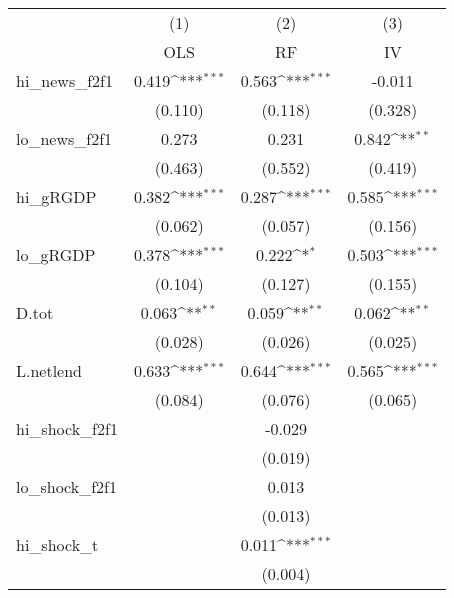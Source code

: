 {
\def\sym#1{\ifmmode^{#1}\else\(^{#1}\)\fi}
\begin{tabular}{l*{3}{c}}
\toprule
            &\multicolumn{1}{c}{(1)}&\multicolumn{1}{c}{(2)}&\multicolumn{1}{c}{(3)}\\
            &\multicolumn{1}{c}{OLS}&\multicolumn{1}{c}{RF}&\multicolumn{1}{c}{IV}\\
\midrule
hi\_news\_f2f1&       0.419\sym{***}&       0.563\sym{***}&      -0.011         \\
            &     (0.110)         &     (0.118)         &     (0.328)         \\
\addlinespace
lo\_news\_f2f1&       0.273         &       0.231         &       0.842\sym{**} \\
            &     (0.463)         &     (0.552)         &     (0.419)         \\
\addlinespace
hi\_gRGDP    &       0.382\sym{***}&       0.287\sym{***}&       0.585\sym{***}\\
            &     (0.062)         &     (0.057)         &     (0.156)         \\
\addlinespace
lo\_gRGDP    &       0.378\sym{***}&       0.222\sym{*}  &       0.503\sym{***}\\
            &     (0.104)         &     (0.127)         &     (0.155)         \\
\addlinespace
D.tot       &       0.063\sym{**} &       0.059\sym{**} &       0.062\sym{**} \\
            &     (0.028)         &     (0.026)         &     (0.025)         \\
\addlinespace
L.netlend   &       0.633\sym{***}&       0.644\sym{***}&       0.565\sym{***}\\
            &     (0.084)         &     (0.076)         &     (0.065)         \\
\addlinespace
hi\_shock\_f2f1&                     &      -0.029         &                     \\
            &                     &     (0.019)         &                     \\
\addlinespace
lo\_shock\_f2f1&                     &       0.013         &                     \\
            &                     &     (0.013)         &                     \\
\addlinespace
hi\_shock\_t  &                     &       0.011\sym{***}&                     \\
            &                     &     (0.004)         &                     \\

\end{tabular}}
